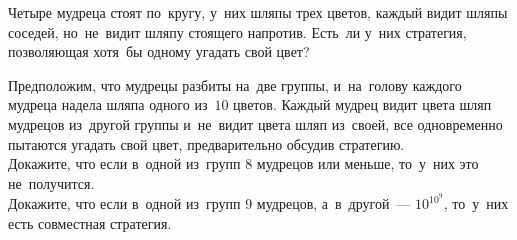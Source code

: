 \begin{problems}
\item
Четыре мудреца стоят по~кругу, у~них шляпы трех цветов, каждый видит шляпы
соседей, но~не~видит шляпу стоящего напротив.
Есть~ли у~них стратегия, позволяющая хотя~бы одному угадать свой цвет?

\item
Предположим, что мудрецы разбиты на~две группы, и~на~голову каждого мудреца
надела шляпа одного из~$10$ цветов.
Каждый мудрец видит цвета шляп мудрецов из~другой группы и~не~видит цвета шляп
из~своей, все одновременно пытаются угадать свой цвет, предварительно обсудив
стратегию.
\\
\subproblem
Докажите, что если в~одной из~групп 8 мудрецов или меньше, то~у~них это
не~получится.
\\
\subproblem
Докажите, что если в~одной из~групп 9 мудрецов, а~в~другой~--- $10^{10^9}$,
то~у~них есть совместная стратегия.

\end{problems}


